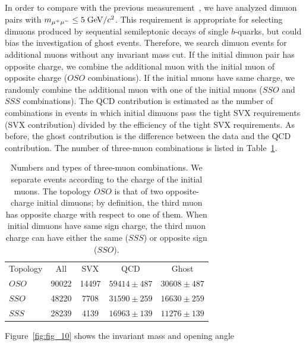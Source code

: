 \documentclass[aps,prd,preprint,floatfix,nofootinbib,superscriptaddress,showpacs,amssymb]{revtex4}
\begin{document}
 In order to compare with the previous measurement~\cite{dilb}, we have
 analyzed dimuon pairs with $ m_{\mu^+ \mu^-} \leq 5 \; {\rm GeV/}c^2 $.
 This requirement is appropriate for selecting dimuons produced by
 sequential semileptonic decays of single $b$-quarks, but could bias the
 investigation of ghost events. Therefore, we search dimuon
 events for additional muons without any invariant mass cut. If the initial
 dimuon pair has opposite charge, we combine the additional muon with the
 initial muon of opposite charge ($OSO$ combinations). If the initial muons
 have  same  charge, we randomly combine the additional muon with one of
 the initial muons ($SSO$ and $SSS$ combinations). The QCD contribution is 
 estimated as the number of combinations in events in which initial dimuons
 pass the tight SVX requirements (SVX contribution) divided by the efficiency
 of the tight SVX requirements. As before, the ghost contribution is the 
 difference between the data and the QCD contribution. The number of
 three-muon combinations is listed in Table~\ref{tab:tab_4}.
 \begin{table}
 \caption[]{Numbers and types of three-muon combinations. We separate
            events according to the charge of the initial muons. The  
            topology $OSO$ is that of two opposite-charge initial dimuons;
            by definition, the third muon has opposite charge with respect
            to one of them. When initial dimuons have same sign charge, 
            the third muon charge can have either the same ($SSS$) or
            opposite sign ($SSO$).}
\begin{center}
\begin{ruledtabular}
 \begin{tabular}{lcccc}
 Topology  &  All   &  SVX    &        QCD       &      Ghost      \\
 $OSO $    &  90022 &  14497  & $59414 \pm 487$  & $30608 \pm 487$ \\
 $SSO $    &  48220 &   7708  & $31590 \pm 259$  & $16630 \pm 259$ \\
 $SSS $    &  28239 &   4139  & $16963 \pm 139$  & $11276 \pm 139$ \\
 \end{tabular}
 \end{ruledtabular}
 \end{center}
 \label{tab:tab_4}
 \end{table}
 Figure~\ref{fig:fig_10} shows the invariant mass and opening angle
\end{document}
